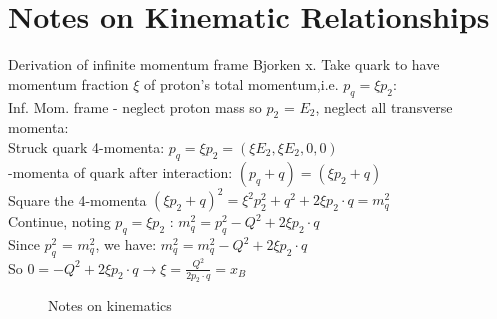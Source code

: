 \chapter{Notes on Kinematic Relationships}


Derivation of infinite momentum frame Bjorken x. Take quark to have momentum fraction $\xi$ of proton's total momentum,i.e. $p_q = \xi p_2$:\\
            \indent Inf. Mom. frame - neglect proton mass so $p_2$ = $E_2$, neglect all transverse momenta:\\
            \indent Struck quark 4-momenta: $p_q = \xi p_2 = (\xi E_2, \xi E_2, 0, 0)$\\
            -momenta of quark after interaction: $(p_q + q) = (\xi p_2 +q)$\\
            \indent Square the 4-momenta $(\xi p_2 +q)^2 = \xi^2 p_2^2 +q^2 + 2\xi p_2 \cdot q  = m_q^2$\\
            \indent Continue, noting $p_q = \xi p_2$ : $m_q^2 = p_q^2 - Q^2 + 2 \xi p_2 \cdot q$\\
            \indent Since $p_q^2$ = $m_q^2$, we have: $m_q^2 = m_q^2 -Q^2 + 2 \xi p_2 \cdot q$\\
            \indent So $0 = -Q^2 + 2\xi p_2 \cdot q \longrightarrow \xi = \frac{Q^2}{2 p_2 \cdot q} = x_B$\\


\begin{figure}
    \centering
    \caption{Notes on kinematics}
    \label{fig:kinematic_curves}
\end{figure}